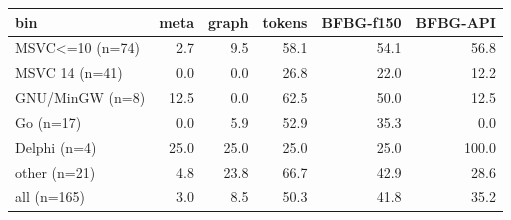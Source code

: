 \begin{tabular}{lrrrrr}
\toprule
bin & meta & graph & tokens & BFBG-f150 & BFBG-API \\
\midrule
MSVC<=10 (n=74) & 2.7 & 9.5 & 58.1 & 54.1 & 56.8 \\
MSVC 14 (n=41) & 0.0 & 0.0 & 26.8 & 22.0 & 12.2 \\
GNU/MinGW (n=8) & 12.5 & 0.0 & 62.5 & 50.0 & 12.5 \\
Go (n=17) & 0.0 & 5.9 & 52.9 & 35.3 & 0.0 \\
Delphi (n=4) & 25.0 & 25.0 & 25.0 & 25.0 & 100.0 \\
other (n=21) & 4.8 & 23.8 & 66.7 & 42.9 & 28.6 \\
all (n=165) & 3.0 & 8.5 & 50.3 & 41.8 & 35.2 \\
\bottomrule
\end{tabular}
